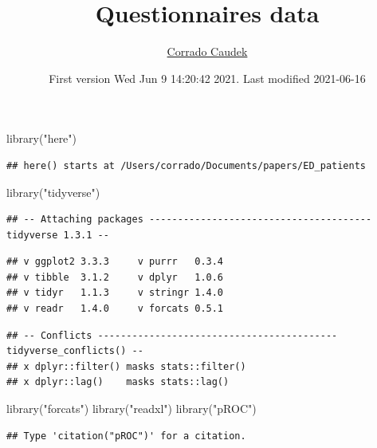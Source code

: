 \documentclass[
]{article}
\title{Questionnaires data}
\author{\href{https://ccaudek.github.io/}{Corrado Caudek}}
\date{First version Wed Jun 9 14:20:42 2021. Last modified 2021-06-16}
\newenvironment{Shaded}{\begin{snugshade}}{\end{snugshade}}
\newcommand{\FunctionTok}[1]{\textcolor[rgb]{0.00,0.00,0.00}{#1}}
\newcommand{\NormalTok}[1]{#1}
\newcommand{\StringTok}[1]{\textcolor[rgb]{0.31,0.60,0.02}{#1}}
\begin{document}
\maketitle

\begin{Shaded}
\begin{Highlighting}[]
\FunctionTok{library}\NormalTok{(}\StringTok{"here"}\NormalTok{)}
\end{Highlighting}
\end{Shaded}

\begin{verbatim}
## here() starts at /Users/corrado/Documents/papers/ED_patients
\end{verbatim}

\begin{Shaded}
\begin{Highlighting}[]
\FunctionTok{library}\NormalTok{(}\StringTok{"tidyverse"}\NormalTok{)}
\end{Highlighting}
\end{Shaded}

\begin{verbatim}
## -- Attaching packages --------------------------------------- tidyverse 1.3.1 --
\end{verbatim}

\begin{verbatim}
## v ggplot2 3.3.3     v purrr   0.3.4
## v tibble  3.1.2     v dplyr   1.0.6
## v tidyr   1.1.3     v stringr 1.4.0
## v readr   1.4.0     v forcats 0.5.1
\end{verbatim}

\begin{verbatim}
## -- Conflicts ------------------------------------------ tidyverse_conflicts() --
## x dplyr::filter() masks stats::filter()
## x dplyr::lag()    masks stats::lag()
\end{verbatim}

\begin{Shaded}
\begin{Highlighting}[]
\FunctionTok{library}\NormalTok{(}\StringTok{"forcats"}\NormalTok{)}
\FunctionTok{library}\NormalTok{(}\StringTok{"readxl"}\NormalTok{)}
\FunctionTok{library}\NormalTok{(}\StringTok{"pROC"}\NormalTok{)}
\end{Highlighting}
\end{Shaded}

\begin{verbatim}
## Type 'citation("pROC")' for a citation.
\end{verbatim}
\end{document}
